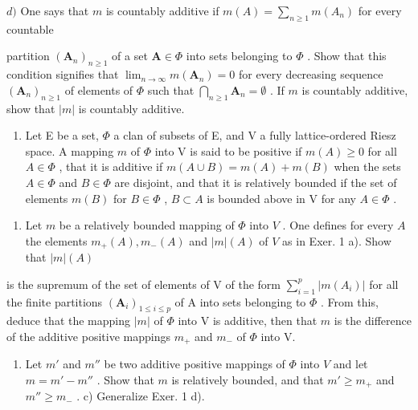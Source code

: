 \(d)\) One says that \(m\) is countably additive if \(m(A) = \sum_{n\geqslant 1}m(A_n)\) for every countable

partition \((\mathbf{A}_n)_{n\geqslant 1}\) of a set \(\mathbf{A}\in \Phi\) into sets belonging to \(\Phi\) . Show that this condition signifies that \(\lim_{n\to \infty}m(\mathbf{A}_n) = 0\) for every decreasing sequence \((\mathbf{A}_n)_{n\geqslant 1}\) of elements of \(\Phi\) such that \(\bigcap_{n\geqslant 1}\mathbf{A}_n = \emptyset\) . If \(m\) is countably additive, show that \(|m|\) is countably additive.

\begin{enumerate}
\def\labelenumi{\arabic{enumi})}
\setcounter{enumi}{1}
\tightlist
\item
  Let E be a set, \(\Phi\) a clan of subsets of E, and V a fully lattice-ordered Riesz space. A mapping \(m\) of \(\Phi\) into V is said to be positive if \(m(A) \geqslant 0\) for all \(A \in \Phi\) , that it is additive if \(m(A \cup B) = m(A) + m(B)\) when the sets \(A \in \Phi\) and \(B \in \Phi\) are disjoint, and that it is relatively bounded if the set of elements \(m(B)\) for \(B \in \Phi\) , \(B \subset A\) is bounded above in V for any \(A \in \Phi\) .
\end{enumerate}

\begin{enumerate}
\def\labelenumi{\alph{enumi})}
\tightlist
\item
  Let \(m\) be a relatively bounded mapping of \(\Phi\) into \(V\) . One defines for every \(A\) the elements \(m_{+}(A), m_{-}(A)\) and \(|m|(A)\) of \(V\) as in Exer. 1 a). Show that \(|m|(A)\)
\end{enumerate}

is the supremum of the set of elements of V of the form \(\sum_{i=1}^{p}|m(A_i)|\) for all the finite partitions \((\mathbf{A}_i)_{1\leqslant i\leqslant p}\) of A into sets belonging to \(\Phi\) . From this, deduce that the mapping \(|m|\) of \(\Phi\) into V is additive, then that \(m\) is the difference of the additive positive mappings \(m_{+}\) and \(m_{-}\) of \(\Phi\) into V.

\begin{enumerate}
\def\labelenumi{\alph{enumi})}
\setcounter{enumi}{1}
\tightlist
\item
  Let \(m'\) and \(m''\) be two additive positive mappings of \(\Phi\) into \(V\) and let \(m = m' - m''\) . Show that \(m\) is relatively bounded, and that \(m' \geqslant m_+\) and \(m'' \geqslant m_-\) . c) Generalize Exer. 1 d).
\end{enumerate}

